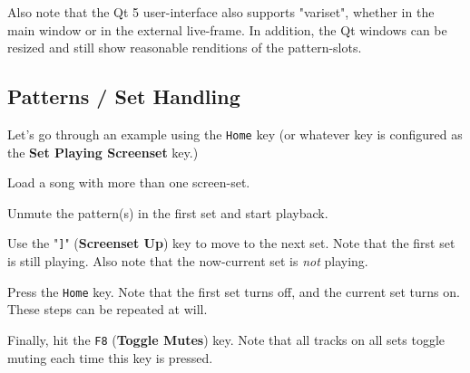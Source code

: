    Also note that the Qt 5 user-interface also supports "variset", whether in
   the main window or in the external live-frame.  In addition, the Qt windows
   can be resized and still show reasonable renditions of the pattern-slots.

\subsection{Patterns / Set Handling}
\label{subsec:patterns_panel_set_handling}

   Let's go through an example using the \texttt{Home} key (or whatever key is
   configured as the \textbf{Set Playing Screenset} key.)

   \begin{enumber}
      \item Load a song with more than one screen-set.
      \item Unmute the pattern(s) in the first set and start playback.
      \item Use the "\texttt{]}" (\textbf{Screenset Up}) key to move to the next
         set.  Note that the first set is still playing.  Also note that the
         now-current set is \textsl{not} playing.
      \item Press the \texttt{Home} key.
         Note that the first set turns off, and the current set turns on.
         These steps can be repeated at will.
      \item Finally, hit the \texttt{F8} (\textbf{Toggle Mutes}) key.
         Note that all tracks on all sets toggle muting each time this key is
         pressed.
   \end{enumber}


